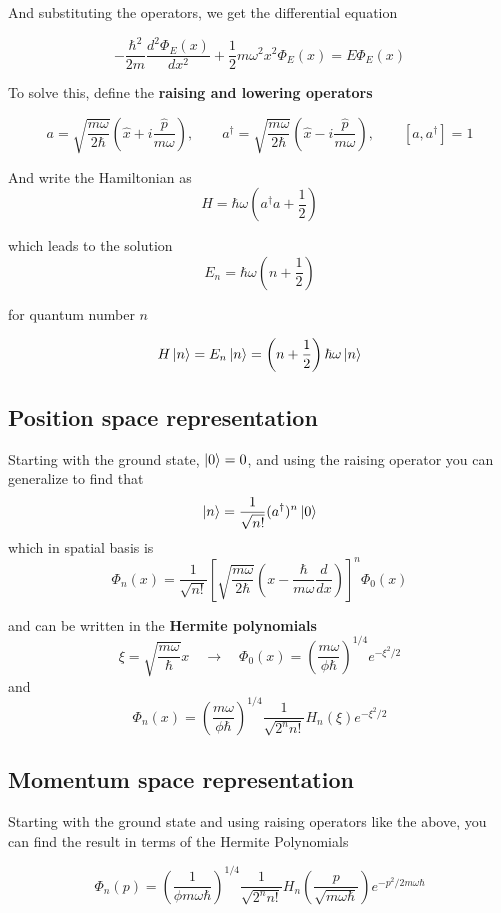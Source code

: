 \documentclass{article}
\begin{document}
And substituting the operators, we get the differential equation 

$$
-\frac{\hbar^2}{2m} \frac{d^2 \Phi_E(x)}{dx^2} + \frac{1}{2}m\omega^2 x^2 \Phi_E(x) = E \Phi_E(x)
$$

To solve this, define the \textbf{raising and lowering operators}

$$
a = \sqrt{\frac{m\omega}{2\hbar}} \left( \hat{x} + i \frac{\hat{p}}{m\omega}\right), \qquad a^\dag = \sqrt{\frac{m\omega}{2\hbar}} \left( \hat{x} - i \frac{\hat{p}}{m\omega}\right), \qquad [a, a^\dag] = 1
$$

And write the Hamiltonian as 
$$
H = \hbar \omega \left( a^\dag a + \frac{1}{2}\right)
$$

which leads to the solution
$$
E_n = \hbar \omega \left( n + \frac{1}{2} \right)
$$

for quantum number $n$

$$
H\ket{n} = E_n \ket{n} = \left(n+\frac{1}{2}\right) \hbar \omega \ket{n}
$$

\subsection{Position space representation}
Starting with the ground state, $\ket{0} = 0$, and using the raising operator you can generalize to find that 
$$
\ket{n} = \frac{1}{\sqrt{n!}}(a^\dag)^n \ket{0}
$$
which in spatial basis is 
$$
\Phi_n(x) = \frac{1}{\sqrt{n!}} \left[ \sqrt{\frac{m\omega}{2\hbar}} \left(x - \frac{\hbar}{m\omega} \frac{d}{dx} \right) \right]^n \Phi_0(x)
$$

and can be written in the \textbf{Hermite polynomials}
$$
\xi = \sqrt{\frac{m\omega}{\hbar}} x \quad \to \quad  \Phi_0(x) = \left( \frac{m\omega}{\phi \hbar}\right)^{1/4} e^{-\xi^2 /2}
$$
and 
$$
\Phi_n(x) = \left( \frac{m\omega}{\phi \hbar}\right)^{1/4} \frac{1}{\sqrt{2^n n!}} H_n(\xi)e^{-\xi^2/2}
$$

\subsection{Momentum space representation}
Starting with the ground state and using raising operators like the above, you can find the result in terms of the Hermite Polynomials

$$
\Phi_n(p) = \left( \frac{1}{\phi m \omega \hbar} \right)^{1/4} \frac{1}{\sqrt{2^n n!}} H_n\left( \frac{p}{\sqrt{m\omega\hbar}} \right) e^{-p^2/2m\omega\hbar}
$$
\end{document}
